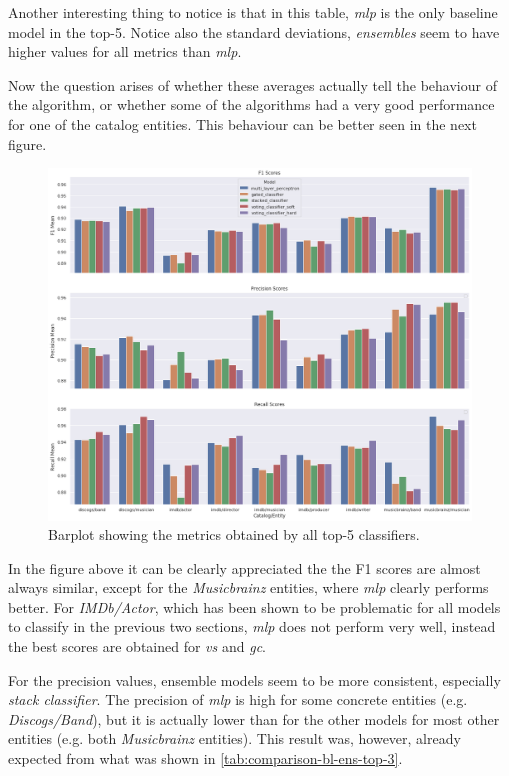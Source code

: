 \documentclass[epsfig,a4paper,11pt,titlepage,twoside,openany]{book}
\begin{document}
Another interesting thing to notice is that in this table, \textit{mlp} is the only baseline model in the top-5. Notice also the standard deviations, \textit{ensembles} seem to have higher values for all metrics than \textit{mlp}. 

Now the question arises of whether these averages actually tell the behaviour of the algorithm, or whether some of the algorithms had a very good performance for one of the catalog entities. This behaviour can be better seen in the next figure.

\begin{figure}[H]
  \centering \includegraphics[width=\textwidth]{comparison_barplots_all_metrics} 
  \caption{Barplot showing the metrics obtained by all top-5 classifiers.}
  \label{fig:comparison-barplot-all-metrics}
\end{figure}

In the figure above it can be clearly appreciated the the F1 scores are almost always similar, except for the \textit{Musicbrainz} entities, where \textit{mlp} clearly performs better. For \textit{IMDb/Actor}, which has been shown to be problematic for all models to classify in the previous two sections, \textit{mlp} does not perform very well, instead the best scores are obtained for \textit{vs} and \textit{gc}.

For the precision values, ensemble models seem to be more consistent, especially \textit{stack classifier}. The precision of \textit{mlp} is high for some concrete entities (e.g. \textit{Discogs/Band}), but it is actually lower than for the other models for most other entities (e.g. both \textit{Musicbrainz} entities). This result was, however, already expected from what was shown in \autoref{tab:comparison-bl-ens-top-3}.
\end{document}
